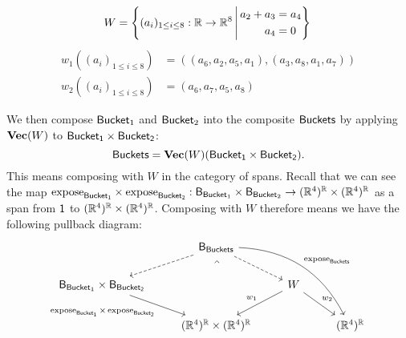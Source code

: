\documentclass[DynamicalBook]{subfiles}
\begin{document}
  \begin{equation}\label{eqn:buckets.span.def}
    W = \left\{ (a_i)_{1 \leq i \leq 8} : \mathbb{R} \to \mathbb{R}^8 \,\middle|\, \begin{aligned}
        a_2 + a_3 &= a_4 \\
        a_4 &= 0
\end{aligned}\right\} \\
  \end{equation}
  \begin{align*}
    w_1((a_i)_{1 \leq i \leq 8}) &= ((a_6, a_2, a_5, a_1), (a_3, a_8, a_1, a_7))\\
    w_2((a_i)_{1 \leq i \leq 8}) &= (a_6, a_7, a_5, a_8)
                                   \end{align*}

We then compose $\mathsf{Bucket}_1$ and $\mathsf{Bucket}_2$ into the composite
$\mathsf{Buckets}$ by applying $\textbf{Vec}(W)$ to $\mathsf{Bucket_1} \times \mathsf{Bucket_2}$:
\[
\mathsf{Buckets} = \textbf{Vec}(W)(\mathsf{Bucket_1} \times \mathsf{Bucket_2}).
\]
This means composing with $W$ in the category of spans. Recall that we can see
the map $\mathrm{expose}_{\mathsf{\mathsf{Bucket}_1}} \times \mathrm{expose}_{\mathsf{\mathsf{Bucket}_2}} :
\mathsf{B}_{\mathsf{Bucket}_1} \times \mathsf{B}_{\mathsf{Bucket}_2} \to (\mathbb{R}^4)^{\mathbb{R}}
\times (\mathbb{R}^4)^{\mathbb{R}}$ as a span from $\mathsf{1}$ to $(\mathbb{R}^4)^{\mathbb{R}} \times
(\mathbb{R}^4)^{\mathbb{R}}$. Composing with $W$ therefore means we have the following
pullback diagram:
\[\begin{tikzcd}
	& {\Set{B}_{\Sys{Buckets}}} \\
	{\Set{B}_{\Sys{Bucket}_1} \times \Set{B}_{\Sys{Bucket_2}}} && W \\
	& {(\rr^4)^{\rr} \times (\rr^4)^{\rr}} && {(\rr^4)^{\rr}}
	\arrow["{w_1}"', from=2-3, to=3-2]
	\arrow["{w_2}", from=2-3, to=3-4]
	\arrow["{\expose{Bucket_1} \,\times\, \expose{Bucket_2}}"', from=2-1, to=3-2]
	\arrow[dashed, from=1-2, to=2-1]
	\arrow[dashed, from=1-2, to=2-3]
	\arrow["\ulcorner"{anchor=center, pos=0.125, rotate=-45}, draw=none, from=1-2, to=3-2]
	\arrow["{\expose{Buckets}}", bend left = 30, from=1-2, to=3-4]
\end{tikzcd}\]
\end{document}
